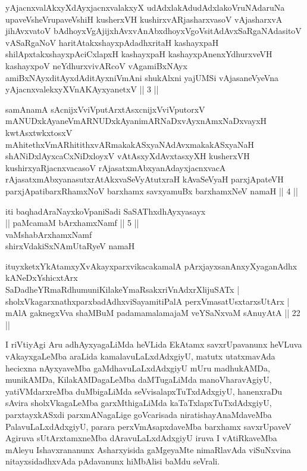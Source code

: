 \begin{shl}
yAjacnxvalAkxyXdAyxjacnxvalakxyX udAdxlakAdudAdxlakoV\s ruNAdaruNa upaveVsheVrupaveVshiH kusherxVH kushirxvARjasharxvasoV vAjasharxvA jihAvxvatoV bAdhoyxVgAjijxhAvxvAnAbxdhoyxVgoV\s sitAdAvxSaRgaNAdasitoV vASaRgaNoV haritAtakxshayxpAdadhxritaH kashayxpaH shilApxtakxshayxpAciCxlapxH kashayxpaH kashayxpAnenxYdhurxveVH kashayxpoV neYdhurxvivARcoV vAgamiBxNAyx amiBxNAyxditAyxdAditAyxniVmAni shukAlxni yajUMSi vAjasaneVyeVna yAjacnxvalekxyXVnAKAyxyanetxV || 3 ||
\end{shl}

\begin{shl}
samAnamA sAcnijxVviVputArxtAsxcnijxVviVputorxV mANUDxkAyaneVmARNUDxkAyanimARNaDxvAyxnAmxNaDxvayxH kwtAsxtwkxtosxV mAhitethxVmARhitithxvARmakakASxyaNAdAvxmakakASxyaNaH shANiDxlAyxcaCxNiDxloyxV vAtAsxyXdAvxtasxyXH kusherxVH kushirxyaRjacnxvacasoV rAjasatxmAbxyanAdayxjacnxvacA rAjasatxmAbxyanasutxrAtAkxvaSeVyAtutxraH kAvaSeVyaH parxjApateVH parxjApatibarxRhamxNoV barxhamx savxyamuBx barxhamxNeV namaH || 4 ||
\end{shl}

\begin{center}
iti baqhadAraNayxkoVpaniSadi SaSAThxdhAyxyasayx\\
|| paMcamaM bArxhamxNamf || 5 ||\\
vaMshabArxhamxNamf\\
shirxVdakiSxNAmUtaRyeV namaH
\end{center}

\begin{shl}
ituyxketxYkAtamxyXvAkayxparxvikacakamalA pArxjayxsanAnxyXyaganAdhx \\
kANeDxYshicxtArx SaDadheYRmaRdhumuniKilakeYmaRsakxriVnAdxrXlijuSATx | \\
sholxVkagarxnathxparxbadAdhx\s viSayamitiPalA perxVmasatUsxtarxsUtArx | \\
mAlA gaknegxVva shaMBuM padamamalamajaM veYSaNxvaM sA\s nuyAtA \hfill||  22 ||  
\end{shl}

\begin{artha}
I riVtiyAgi Aru adhAyxyagaLiMda heVLida EkAtamx savxrUpavanunx heVLuva 
vAkayxgaLeMba araLida kamalavuLaLxdAdxgiyU, matutx utatxmavAda 
hecicxna nAyxyaveMba gaMdhavuLaLxdAdxgiyU mUru madhukAMDa, munikAMDa, 
KilakAMDagaLeMba daMTugaLiMda manoVharavAgiyU, yatiVMdarxreMba 
duMbigaLiMda seVvisalapxTuTxdAdxgiyU, hanenxraDu sAvira 
sholxVkagaLeMba garxMthigaLiMda kaTaTxlapxTuTxdAdxgiyU, parxtayxkASxdi 
parxmANagaLige goVcarisada niratishayAnaMdaveMba PalavuLaLxdAdxgiyU, 
parara perxVmAsapxdaveMba barxhamx savxrUpaveV Agiruva sUtArxtamxneMba 
dAravuLaLxdAdxgiyU iruva I vAtiRkaveMba mAleyu Ishavxrananunx 
Asharxyisida gaMgeyaMte nimaRlavAda viSuNxvina nitayxsidadhxvAda 
pAdavanunx hiMbAlisi baMdu seVrali.
\end{artha}

